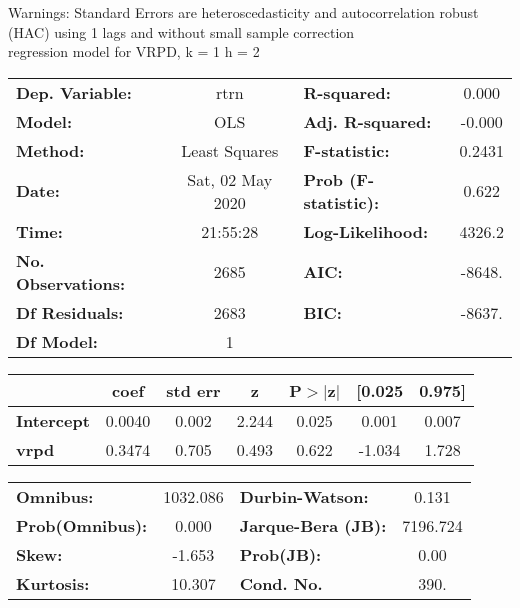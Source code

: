 Warnings: \newline
 [1] Standard Errors are heteroscedasticity and autocorrelation robust (HAC) using 1 lags and without small sample correction\\ 

regression model for VRPD, k = 1 h = 2\begin{center}
\begin{tabular}{lclc}
\toprule
\textbf{Dep. Variable:}    &       rtrn       & \textbf{  R-squared:         } &     0.000   \\
\textbf{Model:}            &       OLS        & \textbf{  Adj. R-squared:    } &    -0.000   \\
\textbf{Method:}           &  Least Squares   & \textbf{  F-statistic:       } &    0.2431   \\
\textbf{Date:}             & Sat, 02 May 2020 & \textbf{  Prob (F-statistic):} &    0.622    \\
\textbf{Time:}             &     21:55:28     & \textbf{  Log-Likelihood:    } &    4326.2   \\
\textbf{No. Observations:} &        2685      & \textbf{  AIC:               } &    -8648.   \\
\textbf{Df Residuals:}     &        2683      & \textbf{  BIC:               } &    -8637.   \\
\textbf{Df Model:}         &           1      & \textbf{                     } &             \\
\bottomrule
\end{tabular}
\begin{tabular}{lcccccc}
                   & \textbf{coef} & \textbf{std err} & \textbf{z} & \textbf{P$> |$z$|$} & \textbf{[0.025} & \textbf{0.975]}  \\
\midrule
\textbf{Intercept} &       0.0040  &        0.002     &     2.244  &         0.025        &        0.001    &        0.007     \\
\textbf{vrpd}      &       0.3474  &        0.705     &     0.493  &         0.622        &       -1.034    &        1.728     \\
\bottomrule
\end{tabular}
\begin{tabular}{lclc}
\textbf{Omnibus:}       & 1032.086 & \textbf{  Durbin-Watson:     } &    0.131  \\
\textbf{Prob(Omnibus):} &   0.000  & \textbf{  Jarque-Bera (JB):  } & 7196.724  \\
\textbf{Skew:}          &  -1.653  & \textbf{  Prob(JB):          } &     0.00  \\
\textbf{Kurtosis:}      &  10.307  & \textbf{  Cond. No.          } &     390.  \\
\bottomrule
\end{tabular}
\end{center}

